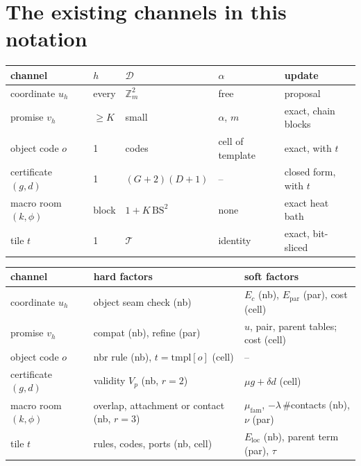 \documentclass[11pt]{article}
\newcommand{\Z}{\mathbb{Z}}
\newcommand{\1}{\mathds{1}}
\newcommand{\Dom}{\mathcal{D}}
\begin{document}
\section{The existing channels in this notation}
\label{sec:existing}

\begin{center}
\small
\begin{tabular}{@{}lllll@{}}
\toprule
channel & $h$ & $\Dom$ & $\alpha$ & update \\
\midrule
coordinate $u_h$ & every & $\Z_m^2$ & free & proposal \\
promise $v_h$ & $\ge K$ & small & $\alpha$, $m$ & exact, chain blocks \\
object code $o$ & 1 & codes & cell of template & exact, with $t$ \\
certificate $(g,d)$ & 1 & $(G{+}2)(D{+}1)$ & -- & closed form, with $t$ \\
macro room $(k,\phi)$ & block & $1 + K\,\mathrm{BS}^2$ & none & exact heat bath \\
tile $t$ & 1 & $\mathcal T$ & identity & exact, bit-sliced \\
\bottomrule
\end{tabular}

\medskip
\begin{tabular}{@{}lll@{}}
\toprule
channel & hard factors & soft factors \\
\midrule
coordinate $u_h$ & object seam check (nb) & $E_c$ (nb), $E_{\mathrm{par}}$ (par), cost (cell) \\
promise $v_h$ & compat (nb), refine (par) & $u$, pair, parent tables; cost (cell) \\
object code $o$ & nbr rule (nb), $t = \mathrm{tmpl}[o]$ (cell) & -- \\
certificate $(g,d)$ & validity $V_p$ (nb, $r = 2$) & $\mu g + \delta d$ (cell) \\
macro room $(k,\phi)$ & overlap, attachment or contact (nb, $r = 3$) & $\mu_{\mathrm{fam}}$, $-\lambda\,\#$contacts (nb), $\nu$ (par) \\
tile $t$ & rules, codes, ports (nb, cell) & $E_{\mathrm{loc}}$ (nb), parent term (par), $\tau$ \\
\bottomrule
\end{tabular}
\end{center}
\end{document}
